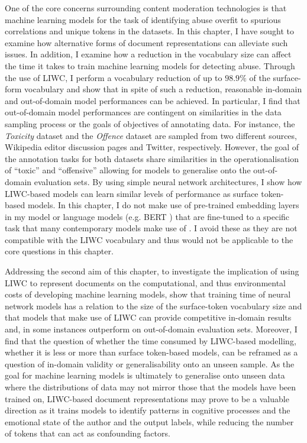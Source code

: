 One of the core concerns surrounding content moderation technologies is that machine learning models for the task of identifying abuse overfit to spurious correlations and unique tokens in the datasets. In this chapter, I have sought to examine how alternative forms of document representations can alleviate such issues. In addition, I examine how a reduction in the vocabulary size can affect the time it takes to train machine learning models for detecting abuse.
Through the use of LIWC, I perform a vocabulary reduction of up to $98.9\%$ of the surface-form vocabulary and show that in spite of such a reduction, reasonable in-domain and out-of-domain model performances can be achieved. In particular, I find that out-of-domain model performances are contingent on similarities in the data sampling process or the goals of objectives of annotating data.
For instance, the \textit{Toxicity} dataset and the \textit{Offence} dataset are sampled from two different sources, Wikipedia editor discussion pages and Twitter, respectively. However, the goal of the annotation tasks for both datasets share similarities in the operationalisation of ``toxic'' and ``offensive'' allowing for models to generalise onto the out-of-domain evaluation sets.
By using simple neural network architectures, I show how LIWC-based models can learn similar levels of performance as surface token-based models. In this chapter, I do not make use of pre-trained embedding layers \citep{Park:2017,Kolhatkar:2021} in my model or language models (e.g. BERT \citep{Devlin:2019}) that are fine-tuned to a specific task that many contemporary models make use of \citep{Vidgen:2021,Isaksen:2020}. I avoid these as they are not compatible with the LIWC vocabulary and thus would not be applicable to the core questions in this chapter. 

Addressing the second aim of this chapter, to investigate the implication of using LIWC to represent documents on the computational, and thus environmental costs of developing machine learning models, show that training time of neural network models has a relation to the size of the surface-token vocabulary size and that models that make use of LIWC can provide competitive in-domain results and, in some instances outperform on out-of-domain evaluation sets. Moreover, I find that the question of whether the time consumed by LIWC-based modelling, whether it is less or more than surface token-based models, can be reframed as a question of in-domain validity or generalisability onto an unseen sample. As the goal for machine learning models is ultimately to generalise onto unseen data where the distributions of data may not mirror those that the models have been trained on, LIWC-based document representations may prove to be a valuable direction as it trains models to identify patterns in cognitive processes and the emotional state of the author and the output labels, while reducing the number of tokens that can act as confounding factors.

